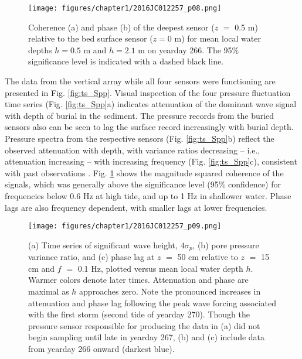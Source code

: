\begin{figure} %
\begin{center}	
		\noindent\texttt{[image: figures/chapter1/2016JC012257\_p08.png]}
	\caption[Pore pressure coherence and phase versus frequency]{Coherence (a) and phase (b) of the deepest sensor ($z$ $=$ 0.5 m) relative to the bed surface sensor ($z = 0$ m) for mean local water depths $h = 0.5$ m and $h = 2.1$ m on yearday 266. The 95\% significance level is indicated with a dashed black line.}
	\label{fig:coh}
\end{center}	
\end{figure}


The data from the vertical array while all four sensors were functioning are presented in Fig. \ref{fig:ts_Spp}. Visual inspection of the four pressure fluctuation time series (Fig. \ref{fig:ts_Spp}a) indicates attenuation of the dominant wave signal with depth of burial in the sediment. The pressure records from the buried sensors also can be seen to lag the surface record increasingly with burial depth. Pressure spectra from the respective sensors (Fig. \ref{fig:ts_Spp}b) reflect the observed attenuation with depth, with variance ratios decreasing -- i.e., attenuation increasing -- with increasing frequency (Fig. \ref{fig:ts_Spp}c), consistent with past observations \citep[][etc.]{Yamamoto_etal1978, Raubenheimer_etal1998, PedrozoAcuna_etal2008}. Fig. \ref{fig:coh} shows the magnitude squared coherence of the signals, which was generally above the significance level (95\% confidence) for frequencies below 0.6 Hz at high tide, and up to 1 Hz in shallower water. Phase lags are also frequency dependent, with smaller lags at lower frequencies.

\begin{figure} %
		\noindent\texttt{[image: figures/chapter1/2016JC012257\_p09.png]}
	\caption[Significant wave height and pore pressure response]{(a) Time series of significant wave height, $4\sigma_{p}$, (b) pore pressure variance ratio, and (c) phase lag at $z$ $=$ 50 cm relative to $z$ $=$ 15 cm and $f$ $=$ 0.1 Hz, plotted versus mean local water depth $h$. Warmer colors denote later times. Attenuation and phase are maximal as $h$ approaches zero. Note the pronounced increases in attenuation and phase lag following the peak wave forcing associated with the first storm (second tide of yearday 270). Though the pressure sensor responsible for producing the data in (a) did not begin sampling until late in yearday 267, (b) and (c) include data from yearday 266 onward (darkest blue).}
	\label{fig:full_Hsig}
\end{figure}


